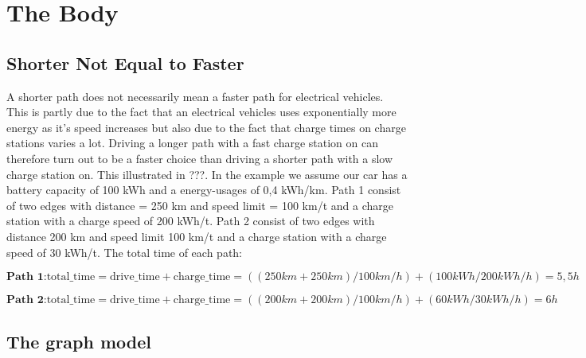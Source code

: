 \section{The Body}

\subsection{Shorter Not Equal to Faster}

A shorter path does not necessarily mean a faster path for electrical vehicles. 
This is partly due to the fact that an electrical vehicles uses exponentially more energy 
as it's speed increases but also due to the fact that charge times on charge stations
varies a lot. Driving a longer path with a fast charge station on can therefore turn out to
be a faster choice than driving a shorter path with a slow charge station on. This illustrated 
in ???. In the example we assume our car has a battery capacity of 100 kWh and a energy-usages of
0,4 kWh/km. Path 1 consist of two edges with distance = 250 km and speed limit = 100 km/t
and a charge station with a charge speed of 200 kWh/t. Path 2 consist of two edges with
distance 200 km and speed limit 100 km/t and a charge station with a charge speed of 30 kWh/t.
The total time of each path:

\[\textbf{Path 1:} \text{total\_time} = \text{drive\_time} + \text{charge\_time} = 
				((250 km + 250 km) / 100 km/h) + (100 kWh / 200 kWh/h) = 5,5 h\]

\[\textbf{Path 2:} \text{total\_time} = \text{drive\_time} + \text{charge\_time} = 
				((200 km + 200 km) / 100 km/h) + (60 kWh / 30 kWh/h) = 6 h\]
 
\subsection{The graph model}

